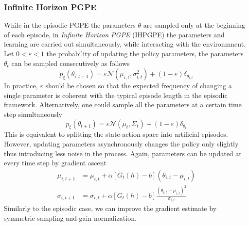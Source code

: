 \subsubsection{Infinite Horizon PGPE}
While in the episodic PGPE the parameters $\theta$ are sampled only at the beginning of each episode, in \emph{Infinite Horizon PGPE} (IHPGPE) \cite{sehnke2012parameter} the parameters and learning are carried out simultaneously, while interacting with the environmnent. Let $0 < \varepsilon < 1$ the probability of updating the policy parameters, the parameters $\theta_t$ can be sampled consecutively as follows
\begin{equation}
	p_\xi(\theta_{i,t+1}) = \varepsilon \mathcal{N}(\mu_{i,t}, \sigma_{i,t}^2) 
							+ (1-\varepsilon) \delta_{\theta_{i,t}}
\end{equation}
In practice, $\varepsilon$ should be chosen so that the expected frequency of
changing a single parameter is coherent with the typical episode length in the
episodic framework. Alternatively, one could sample all the parameters at a
certain time step simultaneously
\begin{equation}
	p_\xi(\theta_{t+1}) = \varepsilon \mathcal{N}(\mu_{t}, \Sigma_t) 
							+ (1-\varepsilon) \delta_{\theta_{t}}
\end{equation}
This is equivalent to splitting the state-action space into artificial
episodes. However, updating parameters asynchronously changes the policy only
slightly thus introducing less noise in the process. Again, parameters can be
updated at every time step by gradient ascent
\begin{equation}
	\begin{split}
		\mu_{i,t+1} &= \mu_{i,t} + \alpha \left[G_t(h) - b\right] (\theta_{i,t}
		- \mu_{i,t})\\
		\sigma_{i,t+1} &= \sigma_{i,t} + \alpha \left[G_t(h) - b\right] 
		\frac{(\theta_{i,t} -\mu_{i,t})^2}{\sigma_{i,t}}
	\end{split}
\end{equation}
Similarly to the episodic case, we can improve the gradient estimate by
symmetric sampling and gain normalization. 